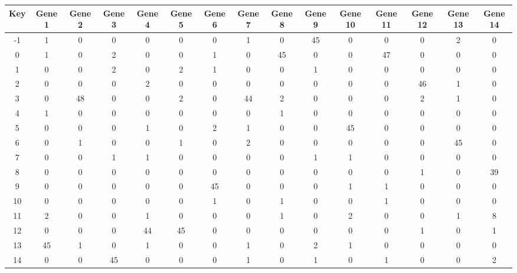 \begin{tabular}{|c|c|c|c|c|c|c|c|c|c|c|c|c|c|c|}
\hline
Key & Gene 1 & Gene 2 & Gene 3 & Gene 4 & Gene 5 & Gene 6 & Gene 7 & Gene 8 & Gene 9 & Gene 10 & Gene 11 & Gene 12 & Gene 13 & Gene 14 \\
\hline
-1 & 1 & 0 & 0 & 0 & 0 & 0 & 1 & 0 & 45 & 0 & 0 & 0 & 2 & 0 \\
0 & 1 & 0 & 2 & 0 & 0 & 1 & 0 & 45 & 0 & 0 & 47 & 0 & 0 & 0 \\
1 & 0 & 0 & 2 & 0 & 2 & 1 & 0 & 0 & 1 & 0 & 0 & 0 & 0 & 0 \\
2 & 0 & 0 & 0 & 2 & 0 & 0 & 0 & 0 & 0 & 0 & 0 & 46 & 1 & 0 \\
3 & 0 & 48 & 0 & 0 & 2 & 0 & 44 & 2 & 0 & 0 & 0 & 2 & 1 & 0 \\
4 & 1 & 0 & 0 & 0 & 0 & 0 & 0 & 1 & 0 & 0 & 0 & 0 & 0 & 0 \\
5 & 0 & 0 & 0 & 1 & 0 & 2 & 1 & 0 & 0 & 45 & 0 & 0 & 0 & 0 \\
6 & 0 & 1 & 0 & 0 & 1 & 0 & 2 & 0 & 0 & 0 & 0 & 0 & 45 & 0 \\
7 & 0 & 0 & 1 & 1 & 0 & 0 & 0 & 0 & 1 & 1 & 0 & 0 & 0 & 0 \\
8 & 0 & 0 & 0 & 0 & 0 & 0 & 0 & 0 & 0 & 0 & 0 & 1 & 0 & 39 \\
9 & 0 & 0 & 0 & 0 & 0 & 45 & 0 & 0 & 0 & 1 & 1 & 0 & 0 & 0 \\
10 & 0 & 0 & 0 & 0 & 0 & 1 & 0 & 1 & 0 & 0 & 1 & 0 & 0 & 0 \\
11 & 2 & 0 & 0 & 1 & 0 & 0 & 0 & 1 & 0 & 2 & 0 & 0 & 1 & 8 \\
12 & 0 & 0 & 0 & 44 & 45 & 0 & 0 & 0 & 0 & 0 & 0 & 1 & 0 & 1 \\
13 & 45 & 1 & 0 & 1 & 0 & 0 & 1 & 0 & 2 & 1 & 0 & 0 & 0 & 0 \\
14 & 0 & 0 & 45 & 0 & 0 & 0 & 1 & 0 & 1 & 0 & 1 & 0 & 0 & 2 \\
\hline
\end{tabular}